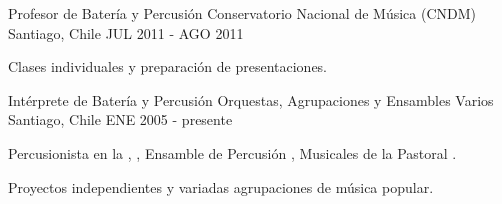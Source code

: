 \begin{cventries}
  \cventry
    {Profesor de Batería y Percusión}
    {Conservatorio Nacional de Música (CNDM)}
    {Santiago, Chile}
    {JUL 2011 - AGO 2011}
    {
      \begin{cvitems} %
        \item {Clases individuales y preparación de presentaciones.}
      \end{cvitems}
    }

  \cventry
    {Intérprete de Batería y Percusión}
    {Orquestas, Agrupaciones y Ensambles Varios}
    {Santiago, Chile}
    {ENE 2005 - presente}
    {
    	\begin{cvitems} %
        \item {Percusionista en la , , Ensamble de Percusión , Musicales de la Pastoral .}
        \item {Proyectos independientes y variadas agrupaciones de música popular.}
      \end{cvitems}
		}

% 
\end{cventries}
